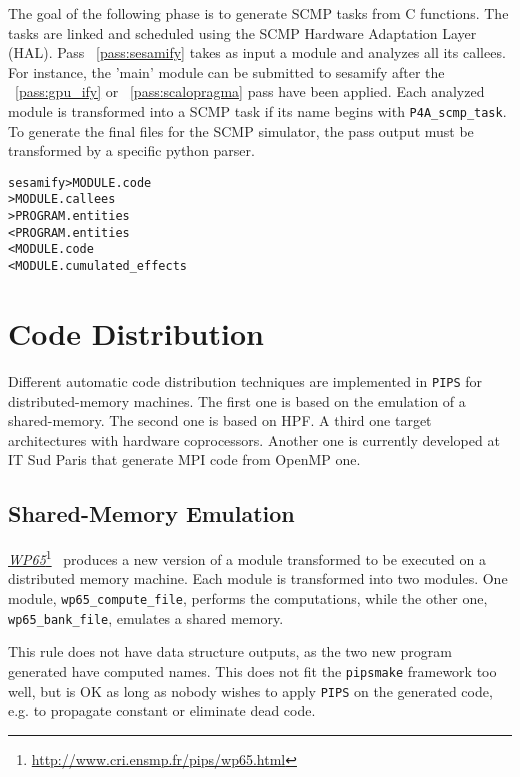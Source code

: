 \documentclass[a4paper]{report}
\newenvironment{PipsMake}{\begin{alltt}}{\end{alltt}}
\newcommand{\PipsPassRef}[1]{\texttt{\detokenize{#1}}~\ref{pass:#1}}
\newcommand{\LINK}[2]{\href{#2}{#1}\footnote{\url{#2}}\xspace}
\newcommand{\Pips}{\texttt{PIPS}}
\newcommand{\Pipsmake}{\texttt{pipsmake}}
\newcommand{\WPsc}{\LINK{\emph{WP65}}{http://www.cri.ensmp.fr/pips/wp65.html}}
\begin{document}
The goal of the following phase is to generate SCMP tasks from C
functions. The tasks are linked and scheduled using the SCMP Hardware
Adaptation Layer (HAL). Pass \PipsPassRef{sesamify} takes as input a
module and analyzes all its callees. For instance, the 'main' module
can be submitted to sesamify after the \PipsPassRef{gpu_ify} or
\PipsPassRef{scalopragma} pass have been applied. Each analyzed module
is transformed into a SCMP task if its name begins with
\texttt{P4A\_scmp\_task}. To generate the final files for the SCMP
simulator, the pass output must be transformed by a specific python
parser.

\begin{PipsMake}
sesamify                    > MODULE.code
		> MODULE.callees
		> PROGRAM.entities
		< PROGRAM.entities
		< MODULE.code
                < MODULE.cumulated_effects
\end{PipsMake}

\section{Code Distribution}
\label{subsection-code-distribution}

Different automatic code distribution techniques are implemented in \Pips{} for
distributed-memory machines. The first one is based on the emulation of
a shared-memory. The second one is based on HPF. A third one target
architectures with hardware coprocessors. Another one is currently
developed at IT Sud Paris that generate MPI code from OpenMP one.

\subsection{Shared-Memory Emulation}
\label{subsubsection-shared-memory-emulation}

\WPsc{}~\cite{IA91,IA92a,IA92b} produces a new version of a module
transformed to be executed on a distributed memory machine. Each module
is transformed into two modules. One module, \texttt{wp65\_compute\_file},
performs the computations, while the other one, \texttt{wp65\_bank\_file},
emulates a shared memory.

This rule does not have data structure outputs, as the two new program
generated have computed names. This does not fit the \Pipsmake{} framework
too well, but is OK as long as nobody wishes to apply \Pips{} on the
generated code, e.g. to propagate constant or eliminate dead code.
\end{document}
